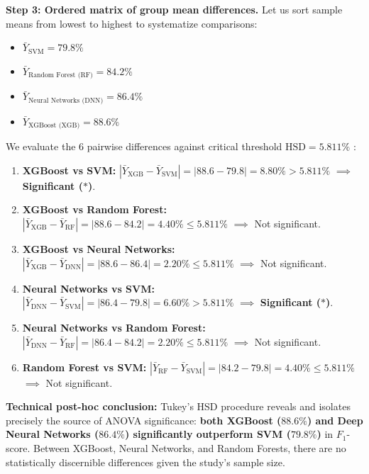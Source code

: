 \begin{solproblema}
	\textbf{Step 3: Ordered matrix of group mean differences.}
	Let us sort sample means from lowest to highest to systematize comparisons:
	\begin{itemize}
		\item $\bar{Y}_{\text{SVM}} = 79.8\%$
		\item $\bar{Y}_{\text{Random Forest (RF)}} = 84.2\%$
		\item $\bar{Y}_{\text{Neural Networks (DNN)}} = 86.4\%$
		\item $\bar{Y}_{\text{XGBoost (XGB)}} = 88.6\%$
	\end{itemize}
	We evaluate the 6 pairwise differences against critical threshold $\text{HSD} = 5.811\%$ :
	\begin{enumerate}
		\item \textbf{XGBoost vs SVM:} $|\bar{Y}_{\text{XGB}} - \bar{Y}_{\text{SVM}}| = |88.6 - 79.8| = 8.80\% > 5.811\%$ $\implies$ \textbf{Significant ($*$)}.
		\item \textbf{XGBoost vs Random Forest:} $|\bar{Y}_{\text{XGB}} - \bar{Y}_{\text{RF}}| = |88.6 - 84.2| = 4.40\% \leq 5.811\%$ $\implies$ Not significant.
		\item \textbf{XGBoost vs Neural Networks:} $|\bar{Y}_{\text{XGB}} - \bar{Y}_{\text{DNN}}| = |88.6 - 86.4| = 2.20\% \leq 5.811\%$ $\implies$ Not significant.
		\item \textbf{Neural Networks vs SVM:} $|\bar{Y}_{\text{DNN}} - \bar{Y}_{\text{SVM}}| = |86.4 - 79.8| = 6.60\% > 5.811\%$ $\implies$ \textbf{Significant ($*$)}.
		\item \textbf{Neural Networks vs Random Forest:} $|\bar{Y}_{\text{DNN}} - \bar{Y}_{\text{RF}}| = |86.4 - 84.2| = 2.20\% \leq 5.811\%$ $\implies$ Not significant.
		\item \textbf{Random Forest vs SVM:} $|\bar{Y}_{\text{RF}} - \bar{Y}_{\text{SVM}}| = |84.2 - 79.8| = 4.40\% \leq 5.811\%$ $\implies$ Not significant.
	\end{enumerate}
	\textbf{Technical post-hoc conclusion:} Tukey's HSD procedure reveals and isolates precisely the source of ANOVA significance: \textbf{both XGBoost ($88.6\%$) and Deep Neural Networks ($86.4\%$) significantly outperform SVM ($79.8\%$)} in $F_1$-score. Between XGBoost, Neural Networks, and Random Forests, there are no statistically discernible differences given the study's sample size.
\end{solproblema}

